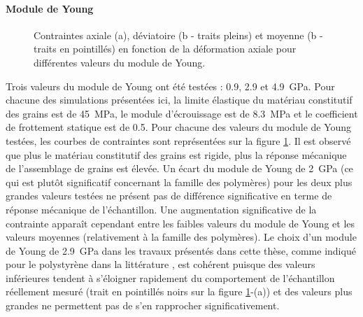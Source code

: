 	\paragraph{Module de Young\\}
		\begin{figure}\centering
			\hfill
			\caption{\label{fig06:material_effect_E}Contraintes axiale (a), déviatoire (b - traits pleins) et moyenne (b - traits en pointillés) en fonction de la déformation axiale pour différentes valeurs du module de Young.}
		\end{figure}
		Trois valeurs du module de Young ont été testées : \num{0.9}, \num{2.9} et \SI{4.9}{\giga\pascal}. Pour chacune des simulations présentées ici, la limite élastique du matériau constitutif des grains est de \SI{45}{\mega\pascal}, le module d'écrouissage est de \SI{8.3}{\mega\pascal} et le coefficient de frottement statique est de \num{0.5}. Pour chacune des valeurs du module de Young testées, les courbes de contraintes sont représentées sur la figure \ref{fig06:material_effect_E}. Il est observé que plus le matériau constitutif des grains est rigide, plus la réponse mécanique de l'assemblage de grains est élevée. Un écart du module de Young de \SI{2}{\giga\pascal} (ce qui est plutôt significatif concernant la famille des polymères) pour les deux plus grandes valeurs testées ne présent pas de différence significative en terme de réponse mécanique de l'échantillon. Une augmentation significative de la contrainte apparaît cependant entre les faibles valeurs du module de Young et les valeurs moyennes (relativement à la famille des polymères). Le choix d'un module de Young de \SI{2.9}{\giga\pascal} dans les travaux présentés dans cette thèse, comme indiqué pour le polystyrène dans la littérature \citep{wypych_handbook_2016, matweb}, est cohérent puisque des valeurs inférieures tendent à s'éloigner rapidement du comportement de l'échantillon réellement mesuré (trait en pointillés noirs sur la figure \ref{fig06:material_effect_E}-(a)) et des valeurs plus grandes ne permettent pas de s'en rapprocher significativement.
